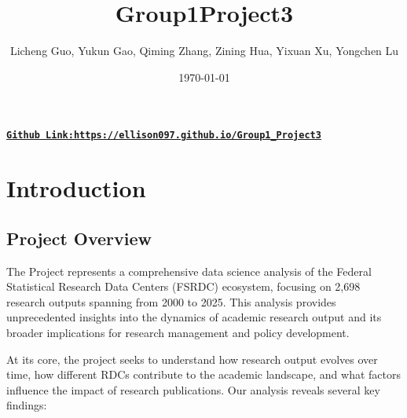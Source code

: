 \documentclass[12pt]{article}
\title{Group1Project3}
\author{Licheng Guo, Yukun Gao, Qiming Zhang, Zining Hua, Yixuan Xu, Yongchen Lu}
\date{\today}
\begin{document}
\sloppy
\maketitle  
\begin{center}
  \href{https://ellison097.github.io/Group1_Project3}{\texttt{\textbf{Github Link:https://ellison097.github.io/Group1\_Project3}}}
\end{center}

\tableofcontents
\newpage

\section{Introduction}

\subsection{Project Overview}
The Project represents a comprehensive data science analysis of the Federal Statistical Research Data Centers (FSRDC) ecosystem, focusing on 2,698 research outputs spanning from 2000 to 2025. This analysis provides unprecedented insights into the dynamics of academic research output and its broader implications for research management and policy development.

At its core, the project seeks to understand how research output evolves over time, how different RDCs contribute to the academic landscape, and what factors influence the impact of research publications. Our analysis reveals several key findings:
\end{document}
